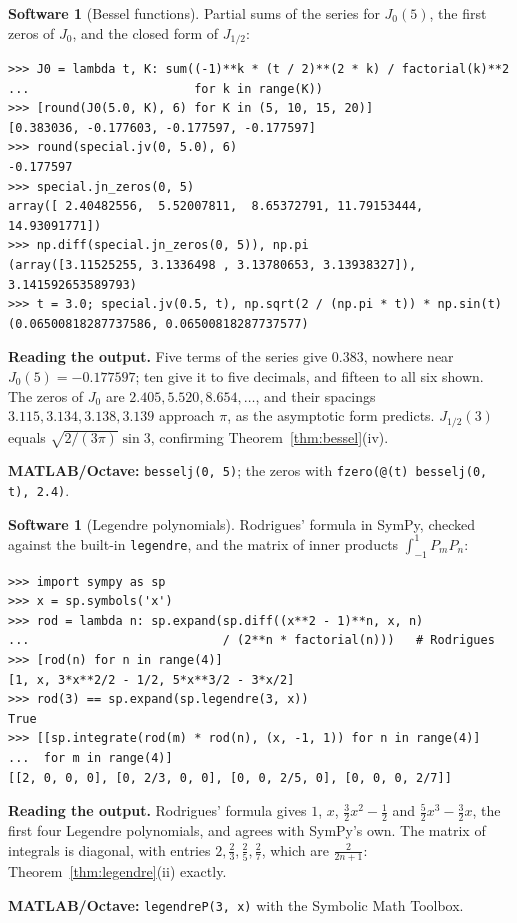 \documentclass[11pt,a4paper]{article}
\numberwithin{equation}{section}
\theoremstyle{definition}
\newtheorem{software}[thm]{Software}
\begin{document}
\begin{software}[Bessel functions]
\label{sw:bessel}
Partial sums of the series for $J_0(5)$, the first zeros of $J_0$, and the closed form of $J_{1/2}$:
{\small\begin{verbatim}
>>> J0 = lambda t, K: sum((-1)**k * (t / 2)**(2 * k) / factorial(k)**2
...                       for k in range(K))
>>> [round(J0(5.0, K), 6) for K in (5, 10, 15, 20)]
[0.383036, -0.177603, -0.177597, -0.177597]
>>> round(special.jv(0, 5.0), 6)
-0.177597
>>> special.jn_zeros(0, 5)
array([ 2.40482556,  5.52007811,  8.65372791, 11.79153444, 14.93091771])
>>> np.diff(special.jn_zeros(0, 5)), np.pi
(array([3.11525255, 3.1336498 , 3.13780653, 3.13938327]), 3.141592653589793)
>>> t = 3.0; special.jv(0.5, t), np.sqrt(2 / (np.pi * t)) * np.sin(t)
(0.06500818287737586, 0.06500818287737577)
\end{verbatim}}
\textbf{Reading the output.} Five terms of the series give $0.383$, nowhere near $J_0(5) = -0.177597$; ten give it to five decimals, and fifteen to all six shown. The zeros of $J_0$ are $2.405, 5.520, 8.654, \dots$,
and their spacings $3.115, 3.134, 3.138, 3.139$ approach $\pi$, as the asymptotic form predicts. $J_{1/2}(3)$ equals $\sqrt{2/(3\pi)}\sin3$, confirming Theorem~\ref{thm:bessel}(iv).

\textbf{MATLAB/Octave:} \texttt{besselj(0, 5)}; the zeros with \texttt{fzero(@(t) besselj(0, t), 2.4)}.
\end{software}

\begin{software}[Legendre polynomials]
\label{sw:legendre}
Rodrigues' formula in SymPy, checked against the built-in \texttt{legendre}, and the matrix of inner products $\int_{-1}^1P_mP_n$:
{\small\begin{verbatim}
>>> import sympy as sp
>>> x = sp.symbols('x')
>>> rod = lambda n: sp.expand(sp.diff((x**2 - 1)**n, x, n)
...                           / (2**n * factorial(n)))   # Rodrigues
>>> [rod(n) for n in range(4)]
[1, x, 3*x**2/2 - 1/2, 5*x**3/2 - 3*x/2]
>>> rod(3) == sp.expand(sp.legendre(3, x))
True
>>> [[sp.integrate(rod(m) * rod(n), (x, -1, 1)) for n in range(4)]
...  for m in range(4)]
[[2, 0, 0, 0], [0, 2/3, 0, 0], [0, 0, 2/5, 0], [0, 0, 0, 2/7]]
\end{verbatim}}
\textbf{Reading the output.} Rodrigues' formula gives $1$, $x$, $\frac32x^2 - \frac12$ and $\frac52x^3 - \frac32x$, the first four Legendre polynomials, and agrees with SymPy's own. The matrix of integrals is diagonal, with
entries $2, \frac23, \frac25, \frac27$, which are $\frac{2}{2n + 1}$: Theorem~\ref{thm:legendre}(ii) exactly.

\textbf{MATLAB/Octave:} \texttt{legendreP(3, x)} with the Symbolic Math Toolbox.
\end{software}
\end{document}
